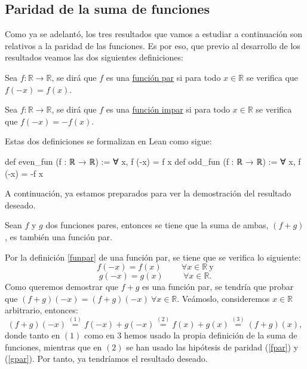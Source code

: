 \subsection{Paridad de la suma de funciones}
Como ya se adelantó, los tres resultados que vamos a estudiar a continuación son relativos a la paridad de las funciones. Es por eso, que previo al desarrollo de los resultados veamos las dos siguientes definiciones:
\begin{definicion}\label{funpar}
	Sea \(f: \mathbb{R}\rightarrow \mathbb{R}\), se dirá que \(f\) es una \underline{función par} si para todo \(x \in \mathbb{R}\) se verifica que \(f(-x)=f(x)\).
\end{definicion}

\begin{definicion}\label{funimpar}
	Sea \(f: \mathbb{R}\rightarrow \mathbb{R}\), se dirá que \(f\) es una \underline{función impar} si para todo \(x \in \mathbb{R}\) se verifica que \(f(-x)=-f(x)\).
\end{definicion}

Estas dos definiciones se formalizan en Lean como sigue:
\begin{leancode}
def even_fun (f : ℝ → ℝ) := ∀ x, f (-x) = f x
def odd_fun (f : ℝ → ℝ) := ∀ x, f (-x) = -f x
\end{leancode}

A continuación, ya estamos preparados para ver la demostración del resultado deseado.
\begin{teorema}
	Sean \(f\) y \(g\) dos funciones pares, entonces se tiene que la suma de ambas, \( (f+g)\), es también una función par.
\end{teorema}
\begin{demostracion}
	Por la definición \ref{funpar} de una función par, se tiene que se verifica lo siguiente:
	\begin{equation}\label{fpar}
	f(-x)=f(x)\hspace{1cm}\forall x \in \mathbb{R} \ \text{y}
	\end{equation}
	\begin{equation}\label{gpar}
	g(-x)=g(x)\hspace{1cm}\forall x \in \mathbb{R}.
	\end{equation}
	Como queremos demostrar que \(f+g\) es una función par, se tendría que probar que \((f+g)(-x)=(f+g) (-x) \ \forall x \in \mathbb{R}\). Veámoslo, consideremos \(x \in \mathbb{R}\) arbitrario, entonces:
	\begin{equation*}
	(f+g)(-x)\stackrel{(1)}{=}f(-x)+g(-x)\stackrel{(2)}{=}f(x)+g(x)\stackrel{(3)}{=}(f+g)(x),
	\end{equation*}
	donde tanto en \((1)\) como en \(3\) hemos usado la propia definición de la suma de funciones, mientras que en \((2) \) se han usado las hipótesis de paridad (\ref{fpar}) y (\ref{gpar}). Por tanto, ya tendríamos el resultado deseado.
\end{demostracion}


